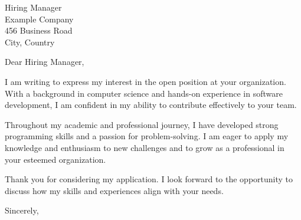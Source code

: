 \documentclass{letter}
\begin{document}
\begin{letter}{Hiring Manager \\ Example Company \\ 456 Business Road \\ City, Country}

\opening{Dear Hiring Manager,}

I am writing to express my interest in the open position at your organization. With a background in computer science and hands-on experience in software development, I am confident in my ability to contribute effectively to your team.

Throughout my academic and professional journey, I have developed strong programming skills and a passion for problem-solving. I am eager to apply my knowledge and enthusiasm to new challenges and to grow as a professional in your esteemed organization.

Thank you for considering my application. I look forward to the opportunity to discuss how my skills and experiences align with your needs.

\closing{Sincerely,}

\end{letter}
\end{document}
